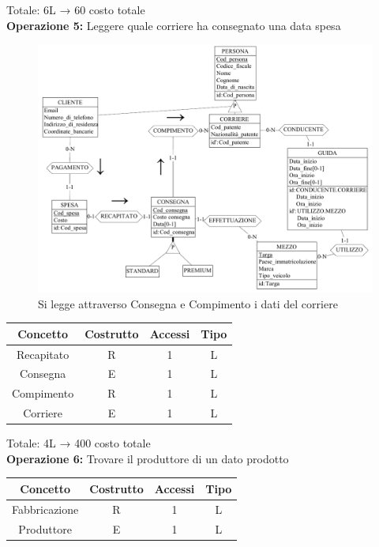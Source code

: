 \documentclass[a4paper,12pt]{report}
\begin{document}
Totale: 6L → 60 costo totale\\
\textbf{Operazione 5:}
Leggere quale corriere ha consegnato una data spesa\\
\begin{figure}[H]
	\centering{}
	\includegraphics[width=\textwidth]{img/Operazione5.pdf}
	\caption{Si legge attraverso Consegna e Compimento i dati del corriere}
\end{figure}
\begin{center}
    \begin{tabular}{ | c   c   c   c | } 
    \hline
	Concetto&Costrutto&Accessi&Tipo\\
	\hline
	Recapitato&R&1&L\\
	\hline
    Consegna&E&1&L\\
	\hline
	Compimento&R&1&L\\
	\hline
	Corriere&E&1&L\\
	\hline
	\end{tabular}
\end{center}
Totale: 4L → 400 costo totale\\
\textbf{Operazione 6:}
Trovare il produttore di un dato prodotto\\
\begin{center}
    \begin{tabular}{ | c   c   c   c | } 
    \hline
	Concetto&Costrutto&Accessi&Tipo\\
	\hline
	Fabbricazione&R&1&L\\
	\hline
    Produttore&E&1&L\\
	\hline
	\end{tabular}
\end{center}
\end{document}
